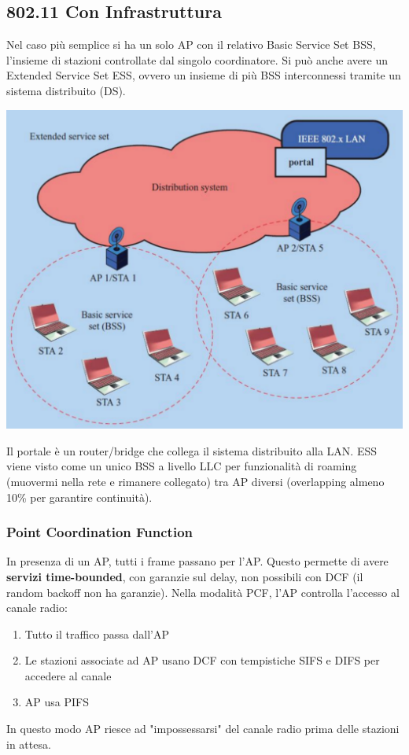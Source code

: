 \subsection{802.11 Con Infrastruttura}

Nel caso più semplice si ha un solo AP con il relativo Basic Service Set BSS, l'insieme di stazioni controllate dal singolo coordinatore. Si può anche avere un Extended Service Set ESS, ovvero un insieme di più BSS interconnessi tramite un sistema distribuito (DS).\\
\begin{center}
	\includegraphics[width=0.8\linewidth]{img/wlan/ess}
\end{center}
Il portale è un router/bridge che collega il sistema distribuito alla LAN. ESS viene visto come un unico BSS a livello LLC per funzionalità di roaming (muovermi nella rete e rimanere collegato) tra AP diversi (overlapping almeno 10\% per garantire continuità).\\

\subsubsection{Point Coordination Function}
In presenza di un AP, tutti i frame passano per l'AP. Questo permette di avere \textbf{servizi time-bounded}, con garanzie sul delay, non possibili con DCF (il random backoff non ha garanzie). Nella modalità PCF, l'AP controlla l'accesso al canale radio: 
\begin{enumerate}
	\item Tutto il traffico passa dall'AP
	\item Le stazioni associate ad AP usano DCF con tempistiche SIFS e DIFS per accedere al canale
	\item AP usa PIFS
\end{enumerate}
In questo modo AP riesce ad "impossessarsi" del canale radio prima delle stazioni in attesa.\\

